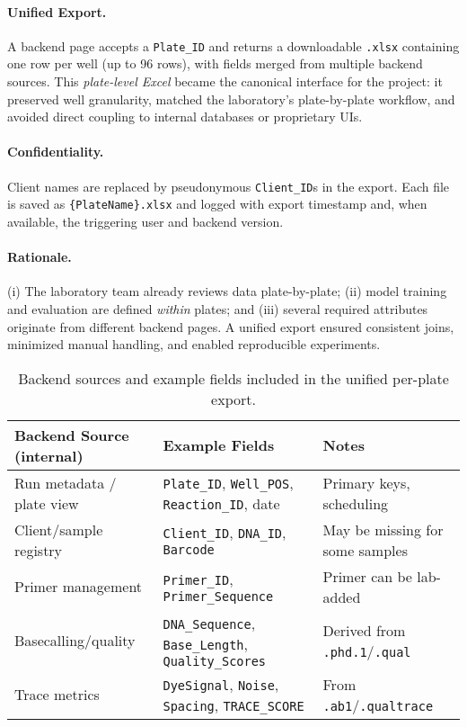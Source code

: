 \paragraph{Unified Export.}
A backend page accepts a \texttt{Plate\_ID} and returns a downloadable \texttt{.xlsx} containing one row per well (up to 96 rows), with fields merged from multiple backend sources. This \emph{plate-level Excel} became the canonical interface for the project: it preserved well granularity, matched the laboratory’s plate-by-plate workflow, and avoided direct coupling to internal databases or proprietary UIs.

\paragraph{Confidentiality.}
Client names are replaced by pseudonymous \texttt{Client\_ID}s in the export. Each file is saved as \texttt{\{PlateName\}.xlsx} and logged with export timestamp and, when available, the triggering user and backend version.

\paragraph{Rationale.}
(i) The laboratory team already reviews data plate-by-plate; (ii) model training and evaluation are defined \emph{within} plates; and (iii) several required attributes originate from different backend pages. A unified export ensured consistent joins, minimized manual handling, and enabled reproducible experiments.

\begin{table}[H]
\centering
\caption{Backend sources and example fields included in the unified per-plate export.}
\label{tab:backend_sources}
\begin{tabular}{|p{3.6cm}|p{6.7cm}|p{5.1cm}|}
\hline
\textbf{Backend Source (internal)} & \textbf{Example Fields} & \textbf{Notes} \\ \hline
Run metadata / plate view & \texttt{Plate\_ID}, \texttt{Well\_POS}, \texttt{Reaction\_ID}, date & Primary keys, scheduling \\ \hline
Client/sample registry & \texttt{Client\_ID}, \texttt{DNA\_ID}, \texttt{Barcode} & May be missing for some samples \\ \hline
Primer management & \texttt{Primer\_ID}, \texttt{Primer\_Sequence} & Primer can be lab-added \\ \hline
Basecalling/quality & \texttt{DNA\_Sequence}, \texttt{Base\_Length}, \texttt{Quality\_Scores} & Derived from \texttt{.phd.1}/\texttt{.qual} \\ \hline
Trace metrics & \texttt{DyeSignal}, \texttt{Noise}, \texttt{Spacing}, \texttt{TRACE\_SCORE} & From \texttt{.ab1}/\texttt{.qualtrace} \\ \hline
\end{tabular}
\end{table}

